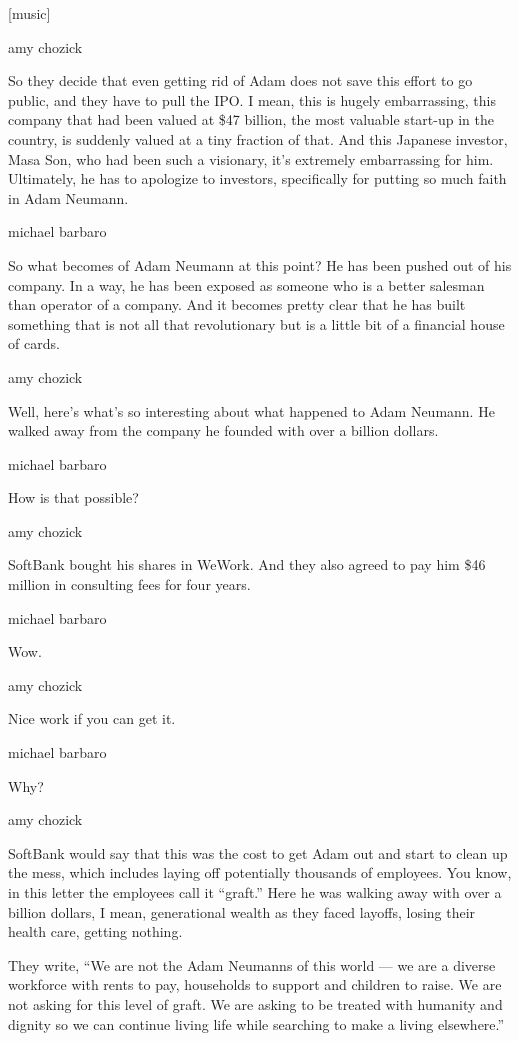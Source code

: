 {[}music{]}

amy chozick

So they decide that even getting rid of Adam does not save this effort
to go public, and they have to pull the IPO. I mean, this is hugely
embarrassing, this company that had been valued at \$47 billion, the
most valuable start-up in the country, is suddenly valued at a tiny
fraction of that. And this Japanese investor, Masa Son, who had been
such a visionary, it's extremely embarrassing for him. Ultimately, he
has to apologize to investors, specifically for putting so much faith in
Adam Neumann.

michael barbaro

So what becomes of Adam Neumann at this point? He has been pushed out of
his company. In a way, he has been exposed as someone who is a better
salesman than operator of a company. And it becomes pretty clear that he
has built something that is not all that revolutionary but is a little
bit of a financial house of cards.

amy chozick

Well, here's what's so interesting about what happened to Adam Neumann.
He walked away from the company he founded with over a billion dollars.

michael barbaro

How is that possible?

amy chozick

SoftBank bought his shares in WeWork. And they also agreed to pay him
\$46 million in consulting fees for four years.

michael barbaro

Wow.

amy chozick

Nice work if you can get it.

michael barbaro

Why?

amy chozick

SoftBank would say that this was the cost to get Adam out and start to
clean up the mess, which includes laying off potentially thousands of
employees. You know, in this letter the employees call it ``graft.''
Here he was walking away with over a billion dollars, I mean,
generational wealth as they faced layoffs, losing their health care,
getting nothing.

They write, ``We are not the Adam Neumanns of this world --- we are a
diverse workforce with rents to pay, households to support and children
to raise. We are not asking for this level of graft. We are asking to be
treated with humanity and dignity so we can continue living life while
searching to make a living elsewhere.''

